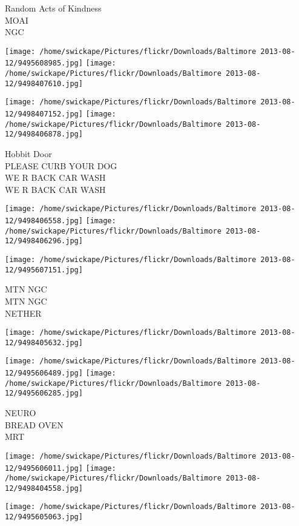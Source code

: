 \documentclass[10pt,letterpaper]{article}
\begin{document}
Random Acts of Kindness\\
MOAI\\
NGC
\pagebreak

\texttt{[image: /home/swickape/Pictures/flickr/Downloads/Baltimore 2013-08-12/9495608985.jpg]}
\texttt{[image: /home/swickape/Pictures/flickr/Downloads/Baltimore 2013-08-12/9498407610.jpg]}

\texttt{[image: /home/swickape/Pictures/flickr/Downloads/Baltimore 2013-08-12/9498407152.jpg]}
\texttt{[image: /home/swickape/Pictures/flickr/Downloads/Baltimore 2013-08-12/9498406878.jpg]}

Hobbit Door\\
PLEASE CURB YOUR DOG\\
WE R BACK CAR WASH\\
WE R BACK CAR WASH
\pagebreak

\texttt{[image: /home/swickape/Pictures/flickr/Downloads/Baltimore 2013-08-12/9498406558.jpg]}
\texttt{[image: /home/swickape/Pictures/flickr/Downloads/Baltimore 2013-08-12/9498406296.jpg]}

\texttt{[image: /home/swickape/Pictures/flickr/Downloads/Baltimore 2013-08-12/9495607151.jpg]}

MTN NGC\\
MTN NGC\\
NETHER
\pagebreak

\texttt{[image: /home/swickape/Pictures/flickr/Downloads/Baltimore 2013-08-12/9498405632.jpg]}

\vspace{0.25in}
\texttt{[image: /home/swickape/Pictures/flickr/Downloads/Baltimore 2013-08-12/9495606489.jpg]}
\texttt{[image: /home/swickape/Pictures/flickr/Downloads/Baltimore 2013-08-12/9495606285.jpg]}

NEURO\\
BREAD OVEN\\
MRT
\pagebreak

\texttt{[image: /home/swickape/Pictures/flickr/Downloads/Baltimore 2013-08-12/9495606011.jpg]}
\texttt{[image: /home/swickape/Pictures/flickr/Downloads/Baltimore 2013-08-12/9498404558.jpg]}

\vspace{0.25in}
\texttt{[image: /home/swickape/Pictures/flickr/Downloads/Baltimore 2013-08-12/9495605063.jpg]}
\end{document}
